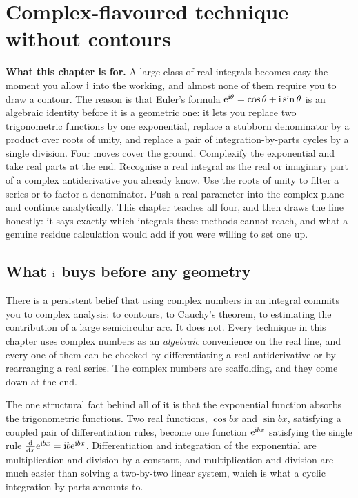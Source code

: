\chapter{Complex-flavoured technique without contours}

\begin{orient}
\textbf{What this chapter is for.} A large class of real integrals becomes easy the moment you allow $\mathrm{i}$ into the working, and almost none of them require you to draw a contour. The reason is that Euler's formula $\mathrm{e}^{\mathrm{i}\theta}=\cos\theta+\mathrm{i}\sin\theta$ is an algebraic identity before it is a geometric one: it lets you replace two trigonometric functions by one exponential, replace a stubborn denominator by a product over roots of unity, and replace a pair of integration-by-parts cycles by a single division. Four moves cover the ground. Complexify the exponential and take real parts at the end. Recognise a real integral as the real or imaginary part of a complex antiderivative you already know. Use the roots of unity to filter a series or to factor a denominator. Push a real parameter into the complex plane and continue analytically. This chapter teaches all four, and then draws the line honestly: it says exactly which integrals these methods cannot reach, and what a genuine residue calculation would add if you were willing to set one up.
\end{orient}

\section{What $\mathrm{i}$ buys before any geometry}

There is a persistent belief that using complex numbers in an integral commits you to complex analysis: to contours, to Cauchy's theorem, to estimating the contribution of a large semicircular arc. It does not. Every technique in this chapter uses complex numbers as an \emph{algebraic} convenience on the real line, and every one of them can be checked by differentiating a real antiderivative or by rearranging a real series. The complex numbers are scaffolding, and they come down at the end.

The one structural fact behind all of it is that the exponential function absorbs the trigonometric functions. Two real functions, $\cos bx$ and $\sin bx$, satisfying a coupled pair of differentiation rules, become one function $\mathrm{e}^{\mathrm{i} bx}$ satisfying the single rule $\frac{\mathrm{d}}{\mathrm{d}x}\mathrm{e}^{\mathrm{i} bx}=\mathrm{i} b\mathrm{e}^{\mathrm{i} bx}$. Differentiation and integration of the exponential are multiplication and division by a constant, and multiplication and division are much easier than solving a two-by-two linear system, which is what a cyclic integration by parts amounts to.

